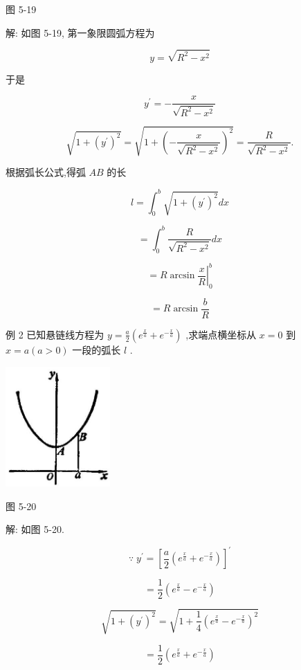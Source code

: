 \documentclass[lang=cn,newtx,10pt,scheme=chinese]{elegantbook}
\begin{document}
图 5-19

解: 如图 5-19, 第一象限圆弧方程为

\[
y = \sqrt{{R}^{2} - {x}^{2}}
\]

于是

\[
{y}^{\prime } = - \frac{x}{\sqrt{{R}^{2} - {x}^{2}}}
\]

\[
\sqrt{1 + {\left( {y}^{\prime }\right) }^{2}} = \sqrt{1 + {\left( -\frac{x}{\sqrt{{R}^{2} - {x}^{2}}}\right) }^{2}} = \frac{R}{\sqrt{{R}^{2} - {x}^{2}}}.
\]

根据弧长公式,得弧 \({AB}\) 的长

\[
l = {\int }_{0}^{b}\sqrt{1 + {\left( {y}^{\prime }\right) }^{2}}{dx}
\]

\[
= {\int }_{0}^{b}\frac{R}{\sqrt{{R}^{2} - {x}^{2}}}{dx}
\]

\[
= {\left. R\arcsin \frac{x}{R}\right| }_{0}^{b}
\]

\[
= R\arcsin \frac{b}{R}
\]

例 2 已知悬链线方程为 \(y = \frac{a}{2}\left( {{e}^{\frac{x}{a}} + {e}^{-\frac{x}{a}}}\right)\) ,求端点横坐标从 \(x = 0\) 到 \(x = a\left( {a > 0}\right)\) 一段的弧长 \(l\) .

\begin{center}
\includegraphics[max width=0.3\textwidth]{images/01912c18-5c3f-733d-b775-749ba9897a9d_243_219487.jpg}
\end{center}

图 5-20

解: 如图 5-20.

\[
\because \;{y}^{\prime } = {\left\lbrack \frac{a}{2}\left( {e}^{\frac{x}{a}} + {e}^{-\frac{x}{a}}\right) \right\rbrack }^{\prime }
\]

\[
= \frac{1}{2}\left( {{e}^{\frac{x}{a}} - {e}^{-\frac{x}{a}}}\right)
\]

\[
\sqrt{1 + {\left( {y}^{\prime }\right) }^{2}} = \sqrt{1 + \frac{1}{4}{\left( {e}^{\frac{x}{a}} - {e}^{-\frac{x}{a}}\right) }^{2}}
\]

\[
= \frac{1}{2}\left( {{e}^{\frac{x}{a}} + {e}^{-\frac{x}{a}}}\right)
\]
\end{document}
